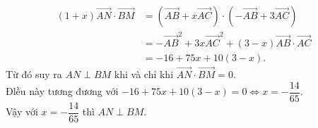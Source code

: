 \begin{bt}
{\begin{enumerate}
		\begin{align*}
			(1+x) \overrightarrow{A N} \cdot \overrightarrow{B M}&=(\overrightarrow{A B}+x \overrightarrow{A C}) \cdot(-\overrightarrow{A B}+3 \overrightarrow{A C})\\
			&=-\overrightarrow{A B}^{2}+3 x \overrightarrow{A C}^{2}+(3-x) \overrightarrow{A B} \cdot \overrightarrow{A C}\\
			&=-16+75 x+10(3-x) .
		\end{align*}
		Từ đó suy ra $A N \perp B M$ khi và chỉ khi $\overrightarrow{A N} \cdot \overrightarrow{B M}=0$.\\
		Đlều này tương đương với $-16+75 x+10(3-x)=0 \Leftrightarrow x=-\dfrac{14}{65}$.\\
		Vậy với $x=-\dfrac{14}{65}$ thì $A N \perp B M$.
	\end{enumerate}
	}
\end{bt}

